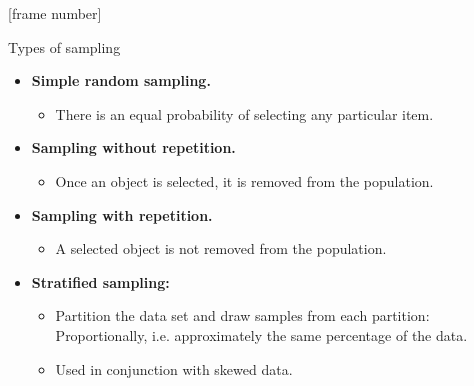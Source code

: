 \documentclass[aspectratio=169,t]{beamer}
\begin{document}
  {
    [frame number]
    \begin{frame}{Types of sampling}
        \begin{itemize}
            \item \textbf{Simple random sampling.}
            \begin{itemize}
              \item There is an equal probability of selecting any particular item.
            \end{itemize}
            \item \textbf{Sampling without repetition.}
            \begin{itemize}
              \item Once an object is selected, it is removed from the population.
            \end{itemize}
            \item \textbf{Sampling with repetition.}
            \begin{itemize}
              \item A selected object is not removed from the population.
            \end{itemize}
            \item \textbf{Stratified sampling:}
            \begin{itemize}
              \item Partition the data set and draw samples from each partition: Proportionally, i.e. approximately the same percentage of the data.
              \item Used in conjunction with skewed data.
            \end{itemize}
        \end{itemize}
    \end{frame}
  }
\end{document}
